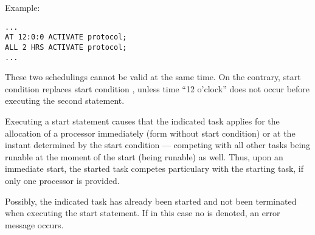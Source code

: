 Example:
\begin{lstlisting}
...
AT 12:0:0 ACTIVATE protocol;
ALL 2 HRS ACTIVATE protocol; 
...
\end{lstlisting}

These two schedulings cannot be valid at the same time. On the contrary,
start condition   replaces start condition 
, unless
time ``12 o'clock'' does not occur before executing the second
statement.


Executing %
 a start statement causes that the indicated task
applies for the allocation of a processor immediately (form without
start condition) or at the instant determined by the start condition ---
competing with all other tasks being runable at the moment
of the start (being runable) as well. Thus, upon an immediate start,
the started task competes particulary with the starting task, if only
one processor is provided.

Possibly, the indicated task has already been started and not been
terminated when executing the start statement. If in this case no
 is denoted, an error message occurs.

